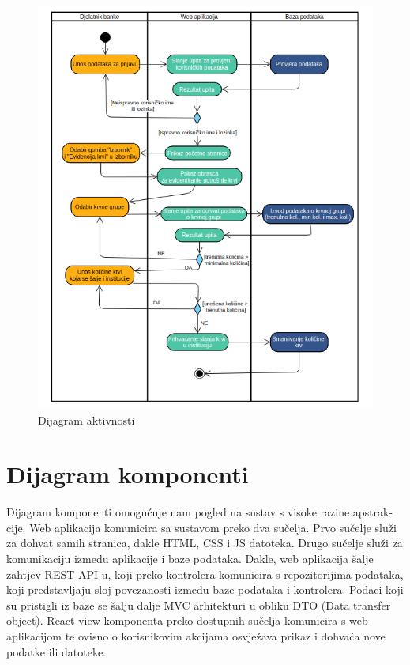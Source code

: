 \begin{figure}[H]
	\centering
	\includegraphics[width=\textwidth, scale=0.5]{dijagrami/dijagram_aktivnosti}
	\caption{Dijagram aktivnosti}
	\label{fig:dijagram_aktivnosti}
\end{figure}
				
			
			\eject
		\section{Dijagram komponenti}
		
			Dijagram komponenti omogućuje nam pogled na sustav s visoke razine apstrak-
cije. Web aplikacija komunicira sa sustavom preko dva sučelja. Prvo sučelje služi
za dohvat samih stranica, dakle HTML, CSS i JS datoteka. Drugo sučelje služi
za komunikaciju između aplikacije i baze podataka. Dakle, web aplikacija šalje
zahtjev REST API-u, koji preko kontrolera komunicira s repozitorijima
podataka, koji predstavljaju sloj povezanosti između baze podataka i kontrolera.  Podaci koji su pristigli
iz baze se šalju dalje MVC arhitekturi u obliku DTO (Data transfer object).
React view komponenta preko dostupnih sučelja komunicira s web aplikacijom te ovisno o korisnikovim akcijama osvježava prikaz i dohvaća nove podatke ili datoteke.

